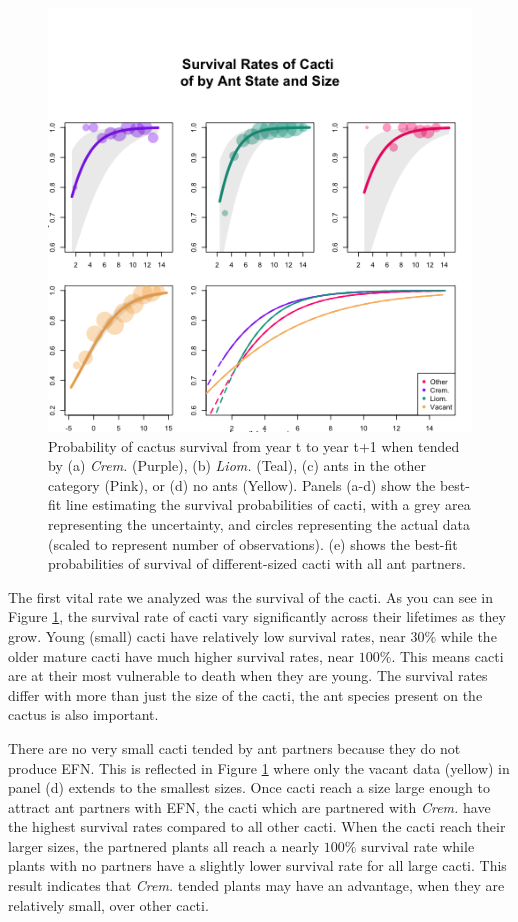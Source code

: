 \documentclass[12pt,a4paper]{article}
\begin{document}
	\begin{figure}[!ht]
	\centering
	\includegraphics[width = 0.85\linewidth]{Figures/surv_panels_cropped.png}
	\caption{Probability of cactus survival from year t to year t+1 when tended by (a) \textit{Crem.} (Purple), (b) \textit{Liom.} (Teal), (c) ants in the other category (Pink), or (d) no ants (Yellow). Panels (a-d) show the best-fit line estimating the survival probabilities of cacti, with a grey area representing the uncertainty, and circles representing the actual data (scaled to represent number of observations). (e) shows the best-fit probabilities of survival of different-sized cacti with all ant partners.}
	\label{fig:surv}
	\end{figure}

	The first vital rate we analyzed was the survival of the cacti. As you can see in Figure \ref{fig:surv}, the survival rate of cacti vary significantly across their lifetimes as they grow. Young (small) cacti have relatively low survival rates, near $30\%$ while the older mature cacti have much higher survival rates, near $100\%$. This means cacti are at their most vulnerable to death when they are young. The survival rates differ with more than just the size of the cacti, the ant species present on the cactus is also important. 
	
	There are no very small cacti tended by ant partners because they do not produce EFN. This is reflected in Figure \ref{fig:surv} where only the vacant data (yellow) in panel (d) extends to the smallest sizes. Once cacti reach a size large enough to attract ant partners with EFN, the cacti which are partnered with \textit{Crem.} have the highest survival rates compared to all other cacti. When the cacti reach their larger sizes, the partnered plants all reach a nearly $100\%$ survival rate while plants with no partners have a slightly lower survival rate for all large cacti. This result indicates that \textit{Crem.} tended plants may have an advantage, when they are relatively small, over other cacti. 
	
\end{document}
